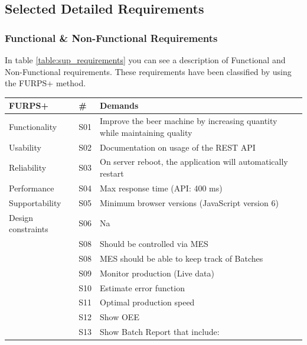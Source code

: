 \subsection{Selected Detailed Requirements}

\subsubsection{Functional \& Non-Functional Requirements}
In table \ref{table:sup_requirements} you can see a description of Functional and
Non-Functional requirements. These requirements have been classified by using
the FURPS+ method.

\begin{table}[H]
    \begin{tabularx}{\textwidth}{|>{\RaggedRight}p{5.25cm}|>{\RaggedRight}p{0.6cm}|>{\RaggedRight}X|}
        \hline
        \textbf{FURPS+}  & \textbf{\#} & \textbf{Demands} \\
        \hline
        Functionality  	& S01 & Improve the beer machine by increasing quantity while maintaining quality \\
        \hline
        Usability      	& S02 & Documentation on usage of the REST API \\
        \hline
        Reliability    	& S03 & On server reboot, the application will automatically restart \\
        \hline
        Performance    	& S04 & Max response time (API: 400 ms) \\
        \hline
        Supportability 	& S05 & Minimum browser versions (JavaScript version 6)\\
        \hline
        Design constraints 	& S06 & Na \\
        \hline
        \multirow{5}{*}{Implementation requirements} & S08 & Should be controlled via MES\\
        \cline{2-3}
                & S08 & MES should be able to keep track of Batches\\
        \cline{2-3}
                & S09 & Monitor production (Live data)\\
        \cline{2-3}
                & S10 & Estimate error function\\
        \cline{2-3}
                & S11 & Optimal production speed\\
        \hline
        \multirow{14}{*}{Interface requirements } & S12 & Show OEE \\
        \cline{2-3}
                & S13 & Show Batch Report that include:

\end{tabularx}
\end{table}
